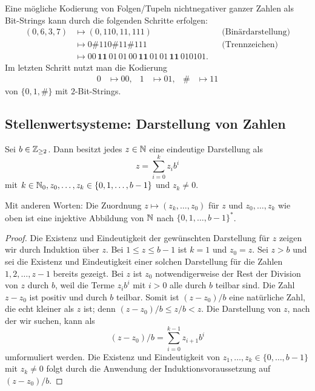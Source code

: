 \begin{bsp}
	Eine mögliche Kodierung von Folgen/Tupeln nichtnegativer ganzer Zahlen als Bit-Strings kann durch die folgenden Schritte erfolgen: 
	\begin{align*}
		(0, 6,3,7) & \mapsto (0,110,11,111)  & & \text{(Binärdarstellung)} 
		\\ & \mapsto 0 \mathbf{\#} 110 \mathbf{\#} 11 \mathbf{\#} 111 & & \text{(Trennzeichen)} 		
		\\ & \mapsto  00 \, \mathbf{11} \,  01 \,  01 \, 00 \, \mathbf{11 }\, 01 \, 01 \, \mathbf{11} \, 01 01 01.
	\end{align*}
	Im letzten Schritt nutzt man die Kodierung 
	\begin{align*}
		0 & \mapsto 00, & 1& \mapsto 01, &  \# & \mapsto 11
	\end{align*}
	von $\{0,1,\#\}$ mit $2$-Bit-Strings. 
\end{bsp} 


\subsection{Stellenwertsysteme: Darstellung von Zahlen}

\begin{thm} \label{thm:stellenwert}
	Sei $b \in \mathbb{Z}_{\ge 2}$. Dann besitzt jedes $z \in \mathbb{N}$ eine eindeutige Darstellung als 
	\begin{equation}\label{z:zur:Basis:b}
		z = \sum_{i=0}^k z_i b^i
	\end{equation}
	mit $k \in \mathbb{N}_0, z_0,\ldots,z_k \in \{0,1,\ldots,b-1\}$ und $z_k \ne 0$.
	
	 Mit anderen Worten: Die Zuordnung $z \mapsto (z_k,\ldots,z_0)$ für $z$ und $z_0,\ldots,z_k$ wie oben ist eine injektive Abbildung von $\mathbb{N}$ nach $\{0,1,\ldots,b-1\}^\ast$.
\end{thm}
\begin{proof}
 	Die Existenz und Eindeutigkeit der gewünschten Darstellung für $z$ zeigen wir durch Induktion über $z$. Bei $1 \le z \le b-1$ ist $k=1$ und $z_0=z$. Sei $z>b$ und sei die Existenz und Eindeutigkeit einer solchen Darstellung für die Zahlen $1,2,\ldots,z-1$ bereits gezeigt. Bei $z$ ist $z_0$ notwendigerweise der Rest der Division von $z$ durch $b$, weil die Terme $z_i b^i$ mit $i>0$ alle durch $b$ teilbar sind. Die Zahl $z-z_0$ ist positiv und durch $b$ teilbar. Somit ist $(z-z_0) / b$ eine natürliche Zahl, die echt kleiner als $z$ ist; denn $(z-z_0)/b \le z / b < z$. Die Darstellung von $z$, nach der wir suchen, kann als 
 	\[
 		(z-z_0)/b = \sum_{i=0}^{k-1} z_{i+1} b^i
 	\]
 	umformuliert werden. Die Existenz und Eindeutigkeit von $z_1,\ldots,z_k \in \{0,\ldots,b-1\}$ mit $z_k \ne 0$ folgt durch die Anwendung der Induktionsvoraussetzung auf $(z-z_0)/b$. 
\end{proof} 

